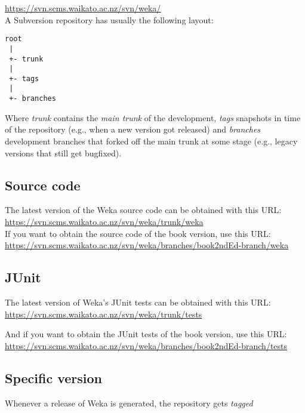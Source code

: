 \url{https://svn.scms.waikato.ac.nz/svn/weka/}{}\\

\noindent A Subversion repository has usually the following layout:

\begin{verbatim}
root
 |
 +- trunk
 |
 +- tags
 |
 +- branches
\end{verbatim}

\noindent Where \textit{trunk} contains the \textit{main trunk} of the
development, \textit{tags} snapshots in time of the repository (e.g.,
when a new version got released) and \textit{branches} development branches
that forked off the main trunk at some stage (e.g., legacy versions
that still get bugfixed).

\subsection{Source code}
The latest version of the Weka source code can be obtained with this URL:\\

\url{https://svn.scms.waikato.ac.nz/svn/weka/trunk/weka}{}\\

\noindent If you want to obtain the source code of the book version, use this URL:\\

\url{https://svn.scms.waikato.ac.nz/svn/weka/branches/book2ndEd-branch/weka}{}\\

\subsection{JUnit}
The latest version of Weka's JUnit tests can be obtained with this URL:\\

\url{https://svn.scms.waikato.ac.nz/svn/weka/trunk/tests}{}

\noindent And if you want to obtain the JUnit tests of the book version, use this URL:\\

\url{https://svn.scms.waikato.ac.nz/svn/weka/branches/book2ndEd-branch/tests}{}

\subsection{Specific version}
Whenever a release of Weka is generated, the repository gets \textit{tagged}

